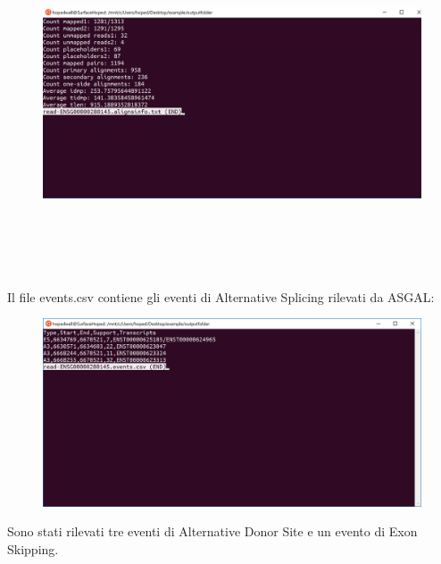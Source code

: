 \begin{figure}[h!]
	\centering
	\includegraphics[width=\linewidth,height=10cm]{images/alignsinfotxt.png}
  \label{fig:AlignsInfoExperiment}
\end{figure}

\newpage

Il file events.csv contiene gli eventi di Alternative Splicing rilevati da ASGAL:


\begin{figure}[h!]
	\centering
	\includegraphics[width=\linewidth]{images/results.png}
  \label{fig:Parameters}
\end{figure}

Sono stati rilevati tre eventi di Alternative Donor Site e un evento di Exon Skipping.

\newpage